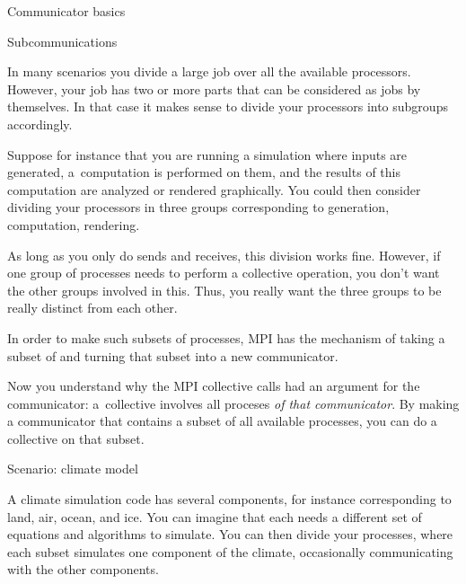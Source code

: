 
 {Communicator basics}



 {Subcommunications}
\label{sec:communicators}

In many scenarios you divide a large job over all the available processors.
However, your job has two or more parts that can be considered as
jobs by themselves. In that case it makes sense to divide your processors
into subgroups accordingly.

Suppose for instance that you are running a simulation where inputs are generated,
a~computation is performed on them, and the results of this computation
are analyzed or rendered graphically. You could then consider dividing your
processors in three groups corresponding to generation, computation, rendering.

As long as you only do sends and receives, this division works fine. However,
if one group of processes needs to perform a collective operation, you don't
want the other groups involved in this. Thus, you really want the three groups
to be really distinct from each other.

In order to make such subsets of processes, MPI has the mechanism of
taking a subset of  and turning that subset
into a new communicator.

Now you understand why the MPI collective calls had an argument for the
communicator: a~collective involves all proceses \emph{of that communicator}.
By making a communicator that contains a subset of all available processes,
you can do a collective on that subset.

 {Scenario: climate model}

A climate simulation code has several components, for instance corresponding
to land, air, ocean, and ice. You can imagine that each needs a different set
of equations and algorithms to simulate. You can then divide your processes,
where each subset simulates one component of the climate, occasionally communicating
with the other components.

